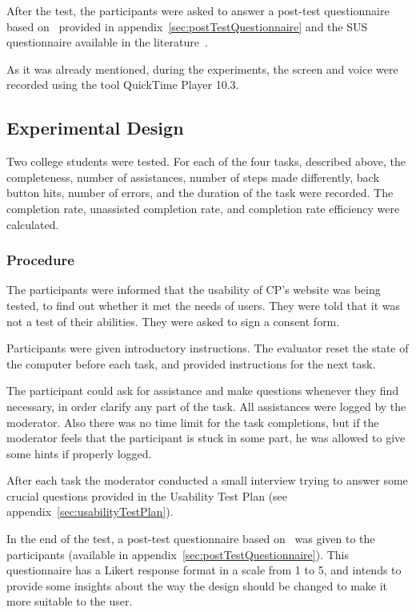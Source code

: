 \documentclass[a4paper]{article}
\begin{document}
After the test, the participants were asked to answer a post-test questionnaire based on~\citep{lawton2004wai_ut} provided in appendix~\ref{sec:postTestQuestionnaire} and the SUS questionnaire available in the literature~\citep{brooke1996sus}.

As it was already mentioned, during the experiments, the screen and voice were recorded using the tool QuickTime Player 10.3.

\subsection{Experimental Design}

Two college students were tested. For each of the four tasks, described above, the completeness, number of assistances, number of steps made differently, back button hits, number of errors, and the duration of the task were recorded. The completion rate, unassisted completion rate, and completion rate efficiency were calculated.

\subsubsection{Procedure}

The participants were informed that the usability of CP's website was being tested, to find out whether it met the needs of users. They were told that it was not a test of their abilities. They were asked to sign a consent form.

Participants were given introductory instructions. The evaluator reset the state of the computer before each task, and provided instructions for the next task. 

The participant could ask for assistance and make questions whenever they find necessary, in order clarify any part of the task. All assistances were logged by the moderator. Also there was no time limit for the task completions, but if the moderator feels that the participant is stuck in some part, he was allowed to give some hints if properly logged.

After each task the moderator conducted a small interview trying to answer some crucial questions provided in the Usability Test Plan (see appendix~\ref{sec:usabilityTestPlan}).

In the end of the test, a post-test questionnaire based on~\citep{lawton2004wai_ut} was given to the participants (available in appendix~\ref{sec:postTestQuestionnaire}).
This questionnaire has a Likert response format in a scale from 1 to 5, and intends to provide some insights about the way the design should be changed to make it more suitable to the user.
\end{document}
